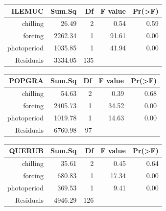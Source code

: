 \documentclass{article}\usepackage[]{graphicx}\usepackage[]{color}
\begin{document}
\begin{table}[ht]
\centering
\begin{tabular}{rrrrr}
  \hline
  ILEMUC & Sum.Sq & Df & F value & Pr(>F) \\
 \hline
chilling & 26.49 &   2 & 0.54 & 0.59 \\ 
  forcing & 2262.34 &   1 & 91.61 & 0.00 \\ 
  photoperiod & 1035.85 &   1 & 41.94 & 0.00 \\ 
  Residuals & 3334.05 & 135 &  &  \\ 
   \hline
\end{tabular}
\end{table}
\begin{table}[ht]
\centering
\begin{tabular}{rrrrr}
  \hline
  POPGRA & Sum.Sq & Df & F value & Pr(>F) \\
 \hline
chilling & 54.63 &   2 & 0.39 & 0.68 \\ 
  forcing & 2405.73 &   1 & 34.52 & 0.00 \\ 
  photoperiod & 1019.78 &   1 & 14.63 & 0.00 \\ 
  Residuals & 6760.98 &  97 &  &  \\ 
   \hline
\end{tabular}
\end{table}
\begin{table}[ht]
\centering
\begin{tabular}{rrrrr}
  \hline
  QUERUB & Sum.Sq & Df & F value & Pr(>F) \\
 \hline
chilling & 35.61 &   2 & 0.45 & 0.64 \\ 
  forcing & 680.83 &   1 & 17.34 & 0.00 \\ 
  photoperiod & 369.53 &   1 & 9.41 & 0.00 \\ 
  Residuals & 4946.29 & 126 &  &  \\ 
   \hline
\end{tabular}
\end{table}
\end{document}
